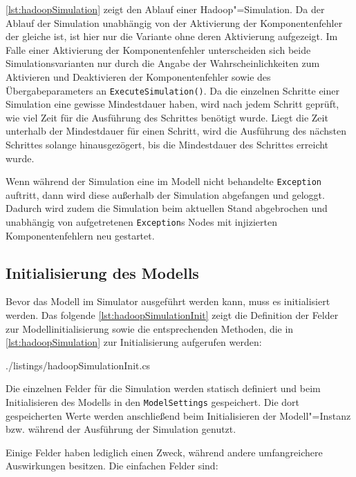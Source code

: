 \autoref{lst:hadoopSimulation} zeigt den Ablauf einer Hadoop"=Simulation.
Da der Ablauf der Simulation unabhängig von der Aktivierung der Komponentenfehler der gleiche ist, ist hier nur die Variante ohne deren Aktivierung aufgezeigt.
Im Falle einer Aktivierung der Komponentenfehler unterscheiden sich beide Simulationsvarianten nur durch die Angabe der Wahrscheinlichkeiten zum Aktivieren und Deaktivieren der Komponentenfehler sowie des Übergabeparameters an \texttt{ExecuteSimulation()}.
Da die einzelnen Schritte einer Simulation eine gewisse Mindestdauer haben, wird nach jedem Schritt geprüft, wie viel Zeit für die Ausführung des Schrittes benötigt wurde.
Liegt die Zeit unterhalb der Mindestdauer für einen Schritt, wird die Ausführung des nächsten Schrittes solange hinausgezögert, bis die Mindestdauer des Schrittes erreicht wurde.

Wenn während der Simulation eine im Modell nicht behandelte \texttt{Exception} auftritt, dann wird diese außerhalb der Simulation abgefangen und geloggt.
Dadurch wird zudem die Simulation beim aktuellen Stand abgebrochen und unabhängig von aufgetretenen \texttt{Exception}s Nodes mit injizierten Komponentenfehlern neu gestartet.

\subsection{Initialisierung des Modells}\label{sec:simulationModelInit}

Bevor das Modell im Simulator ausgeführt werden kann, muss es initialisiert werden.
Das folgende \autoref{lst:hadoopSimulationInit} zeigt die Definition der Felder zur Modellinitialisierung sowie die entsprechenden Methoden, die in \autoref{lst:hadoopSimulation} zur Initialisierung aufgerufen werden:


{./listings/hadoopSimulationInit.cs}

Die einzelnen Felder für die Simulation werden statisch definiert und beim Initialisieren des Modells in den \texttt{ModelSettings} gespeichert.
Die dort gespeicherten Werte werden anschließend beim Initialisieren der Modell"=Instanz bzw. während der Ausführung der Simulation genutzt.

Einige Felder haben lediglich einen Zweck, während andere umfangreichere Auswirkungen besitzen.
Die einfachen Felder sind:

